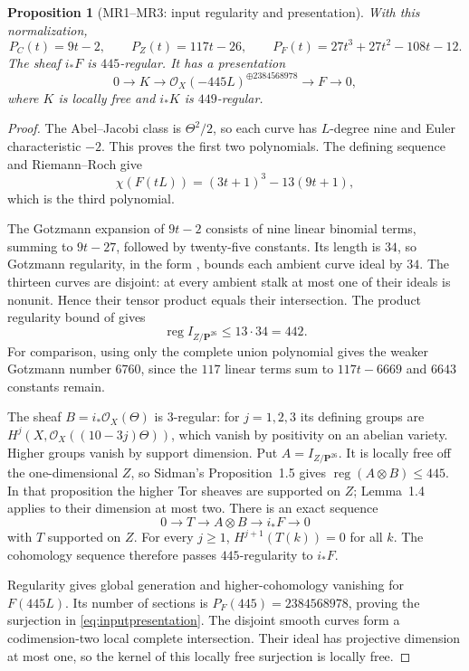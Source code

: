 \documentclass[11pt,a4paper]{article}
\newtheorem{proposition}[theorem]{Proposition}
\theoremstyle{definition}\newtheorem{definition}[theorem]{Definition}
\theoremstyle{remark}\newtheorem{remark}[theorem]{Remark}
\newcommand{\cO}{\mathcal O}\newcommand{\CH}{\operatorname{CH}}\newcommand{\cl}{\operatorname{cl}}
\begin{document}
\begin{proposition}[MR1--MR3: input regularity and presentation]\label{MR}
With this normalization,
\[
 P_C(t)=9t-2,\qquad P_Z(t)=117t-26,\qquad
 P_F(t)=27t^3+27t^2-108t-12.
\]
The sheaf $i_*F$ is $445$-regular. It has a presentation
\begin{equation}\label{eq:inputpresentation}
 0\longrightarrow K\longrightarrow
 \cO_X(-445L)^{\oplus 2384568978}\longrightarrow F\longrightarrow0,
\end{equation}
where $K$ is locally free and $i_*K$ is $449$-regular.
\end{proposition}
\begin{proof}
The Abel--Jacobi class is $\Theta^2/2$, so each curve has $L$-degree nine and Euler characteristic $-2$. This proves the first two polynomials. The defining sequence and Riemann--Roch give
\[
 \chi(F(tL))=(3t+1)^3-13(9t+1),
\]
which is the third polynomial.

The Gotzmann expansion of $9t-2$ consists of nine linear binomial terms, summing to $9t-27$, followed by twenty-five constants. Its length is $34$, so Gotzmann regularity, in the form \citet[Theorem~2.7]{Dellaca14}, bounds each ambient curve ideal by $34$. The thirteen curves are disjoint: at every ambient stalk at most one of their ideals is nonunit. Hence their tensor product equals their intersection. The product regularity bound of \citet[Proposition~1.5 and Corollary~1.6]{Sidman01} gives
\[
 \operatorname{reg}I_{Z/\mathbf P^{26}}\le13\cdot34=442.
\]
For comparison, using only the complete union polynomial gives the weaker Gotzmann number $6760$, since the $117$ linear terms sum to $117t-6669$ and $6643$ constants remain.

The sheaf $B=i_*\cO_X(\Theta)$ is $3$-regular: for $j=1,2,3$ its defining groups are $H^j(X,\cO_X((10-3j)\Theta))$, which vanish by positivity on an abelian variety. Higher groups vanish by support dimension. Put $A=I_{Z/\mathbf P^{26}}$. It is locally free off the one-dimensional $Z$, so Sidman's Proposition~1.5 gives $\operatorname{reg}(A\otimes B)\le445$. In that proposition the higher Tor sheaves are supported on $Z$; Lemma~1.4 applies to their dimension at most two. There is an exact sequence
\[
 0\longrightarrow T\longrightarrow A\otimes B\longrightarrow i_*F\longrightarrow0
\]
with $T$ supported on $Z$. For every $j\ge1$, $H^{j+1}(T(k))=0$ for all $k$. The cohomology sequence therefore passes $445$-regularity to $i_*F$.

Regularity gives global generation and higher-cohomology vanishing for $F(445L)$. Its number of sections is $P_F(445)=2384568978$, proving the surjection in \eqref{eq:inputpresentation}. The disjoint smooth curves form a codimension-two local complete intersection. Their ideal has projective dimension at most one, so the kernel of this locally free surjection is locally free.


\end{proof}
\end{document}
